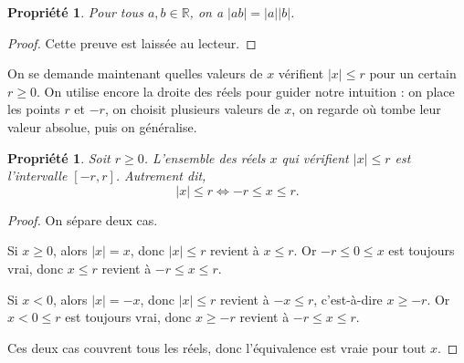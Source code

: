 \documentclass[12pt,a4paper]{article}
\theoremstyle{plain}
\newtheorem{property}[theorem]{Propriété}
\theoremstyle{definition}
\theoremstyle{remark}
\begin{document}
\begin{tcolorbox}[graybar]
  \begin{property}
    \label{prop:abs_ab}
    Pour tous $a, b \in \mathbb{R}$, on a $\lvert ab \rvert = \lvert a \rvert
    \lvert b \rvert$.
  \end{property}
\end{tcolorbox}

\begin{proof}
  Cette preuve est laissée au lecteur.
\end{proof}

On se demande maintenant quelles valeurs de $x$ vérifient $\lvert x \rvert \le r$
pour un certain $r \ge 0$. On utilise encore la droite des réels pour guider
notre intuition : on place les points $r$ et $-r$, on choisit plusieurs valeurs
de $x$, on regarde où tombe leur valeur absolue, puis on généralise.

\begin{center}
\end{center}

\begin{tcolorbox}[graybar]
  \begin{property}
    Soit $r \ge 0$. L'ensemble des réels $x$ qui vérifient $\lvert x \rvert \le r$
    est l'intervalle $[-r, r]$. Autrement dit,
    \[
    \lvert x \rvert \le r \Longleftrightarrow -r \le x \le r.
    \]
  \end{property}
\end{tcolorbox}

\begin{proof}
  On sépare deux cas.
  
  Si $x \ge 0$, alors $\lvert x \rvert = x$, donc $\lvert x \rvert \le r$ revient à
  $x \le r$. Or $-r \le 0 \le x$ est toujours vrai, donc $x \le r$ revient à
  $-r \le x \le r$.
  
  Si $x < 0$, alors $\lvert x \rvert = -x$, donc $\lvert x \rvert \le r$ revient à
  $-x \le r$, c'est-à-dire $x \ge -r$. Or $x < 0 \le r$ est toujours vrai, donc
  $x \ge -r$ revient à $-r \le x \le r$.
  
  Ces deux cas couvrent tous les réels, donc l'équivalence est vraie pour tout $x$.
\end{proof}
\end{document}
